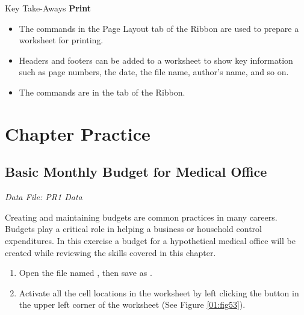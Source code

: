\begin{center}
	\begin{tkwbox}{Key Take-Aways}
		\textbf{Print}
		\\
		\begin{itemize}
			\setlength{\itemsep}{0pt}
			\setlength{\parskip}{0pt}
			\setlength{\parsep}{0pt}

			\item The commands in the Page Layout tab of the Ribbon are used to prepare a worksheet for printing.
			\item Headers and footers can be added to a worksheet to show key information such as page numbers, the date, the file name, author's name, and so on.
			\item The  commands are in the  tab of the Ribbon.
			
		\end{itemize}
	\end{tkwbox}
\end{center}

\section{Chapter Practice}

\subsection{Basic Monthly Budget for Medical Office}

\textit{Data File: PR1 Data}

Creating and maintaining budgets are common practices in many careers. Budgets play a critical role in helping a business or household control expenditures. In this exercise a budget for a hypothetical medical office will be created while reviewing the skills covered in this chapter.

\begin{enumerate}
	\item Open the file named , then save as .
	\item Activate all the cell locations in the  worksheet by left clicking the  button in the upper left corner of the worksheet (See Figure \ref{01:fig53}).
\end{enumerate}

